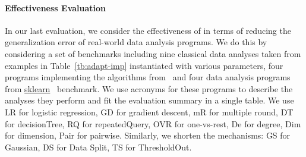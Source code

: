 {\paragraph{Effectiveness Evaluation}

In our last evaluation, we consider the effectiveness of {\THESYSTEM} in terms of reducing the generalization error of real-world data analysis programs.
We do this by considering a set of benchmarks including 
nine classical data analyses taken from examples in Table~\ref{tb:adapt-imp} instantiated with various parameters,
four programs implementing the algorithms from~\cite{Jamieson2015TheAO}
and four data analysis programs 
from \hyperlink{https://github.com/scikit-learn/scikit-learn/tree/main/examples}{sklearn}~\cite{SklearnBenchmark} benchmark.
{We use acronyms for these programs to describe the analyses they perform and fit the evaluation summary in a single table. We use LR for logistic regression, GD for gradient descent, mR for multiple round, DT for decisionTree, RQ for repeatedQuery, OVR for one-vs-rest, De for degree, Dim for dimension, Pair for pairwise. Similarly, we shorten the mechanisms: GS for Gaussian, DS for Data Split,
TS for ThresholdOut.  }

}
